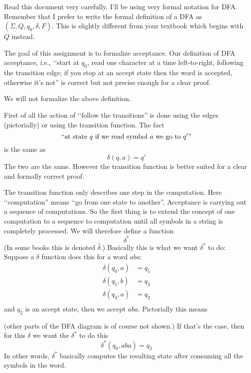 \newpage

Read this document very carefully.
I'll be using very formal notation for DFA.
Remember that I prefer to write the formal definition of a DFA
as $(\Sigma, Q, q_0, \delta, F)$.
This is slightly different from your textbook which begins with 
$Q$ instead. 

The goal of this assignment is to formalize acceptance.
Our definition of DFA acceptance, i.e., 
\lq\lq start at $q_0$, read one character at a time left-to-right,
following the transition edge; if you stop at an accept state then
the word is accepted, otherwise it's not''
is correct but not precise enough for a clear proof.

We will not formalize the above definition.

First of all the action of \lq\lq follow the transitions''
is done using the edges (pictorially) or using the transition
function. 
The fact
\[
\text{\lq\lq at state $q$ if we read symbol $a$ we go to $q'$''}
\]
is the same as
\[
\delta(q, a) = q'
\] 
The two are the same.
However the transition function is better suited for a clear
and formally correct proof.

The transition function only describes one step in the computation.
Here \lq\lq computation'' means \lq\lq go from one state to another''.
Acceptance is carrying out a sequence of computations.
So the first thing is to extend the concept of one computation
to a sequence to computation until all symbols in a string is 
completely processed.
We will therefore define a function
\[
\delta^*
\]
(In some books this is denoted $\widehat{\delta}$.)
Basically this is what we want $\delta^*$ to do:
Suppose a $\delta$ function does this for a word $aba$:
\begin{align*}
\delta(q_0, a) &= q_5 \\
\delta(q_5, b) &= q_3 \\
\delta(q_3, a) &= q_2 \\
\end{align*}
and $q_2$ is an accept state, then we accept $aba$.
Pictorially this means
\begin{center}
\end{center}
(other parts of the DFA diagram is of course not shown.)
If that's the case, then for this $\delta$ we want the $\delta^*$ to 
do this
\[
\delta^*(q_0, aba) = q_2
\]
In other words, $\delta^*$ basically computes the resulting state
after consuming all the symbols in the word.

